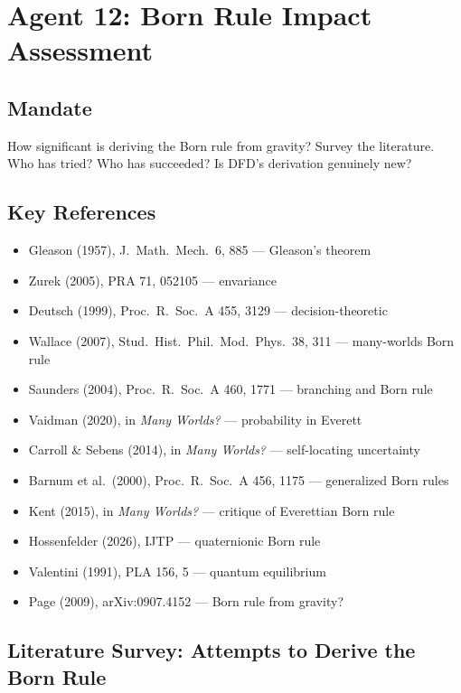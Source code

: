 \documentclass[11pt,a4paper]{article}
\begin{document}
\section{Agent 12: Born Rule Impact Assessment}
\label{sec:agent12}

\subsection{Mandate}

How significant is deriving the Born rule from gravity? Survey the literature. Who has tried? Who has succeeded? Is DFD's derivation genuinely new?

\subsection{Key References}

\begin{itemize}
\item Gleason (1957), J.\ Math.\ Mech.\ 6, 885 --- Gleason's theorem
\item Zurek (2005), PRA 71, 052105 --- envariance
\item Deutsch (1999), Proc.\ R.\ Soc.\ A 455, 3129 --- decision-theoretic
\item Wallace (2007), Stud.\ Hist.\ Phil.\ Mod.\ Phys.\ 38, 311 --- many-worlds Born rule
\item Saunders (2004), Proc.\ R.\ Soc.\ A 460, 1771 --- branching and Born rule
\item Vaidman (2020), in \emph{Many Worlds?} --- probability in Everett
\item Carroll \& Sebens (2014), in \emph{Many Worlds?} --- self-locating uncertainty
\item Barnum et al.\ (2000), Proc.\ R.\ Soc.\ A 456, 1175 --- generalized Born rules
\item Kent (2015), in \emph{Many Worlds?} --- critique of Everettian Born rule
\item Hossenfelder (2026), IJTP --- quaternionic Born rule
\item Valentini (1991), PLA 156, 5 --- quantum equilibrium
\item Page (2009), arXiv:0907.4152 --- Born rule from gravity?
\end{itemize}

\subsection{Literature Survey: Attempts to Derive the Born Rule}
\end{document}

